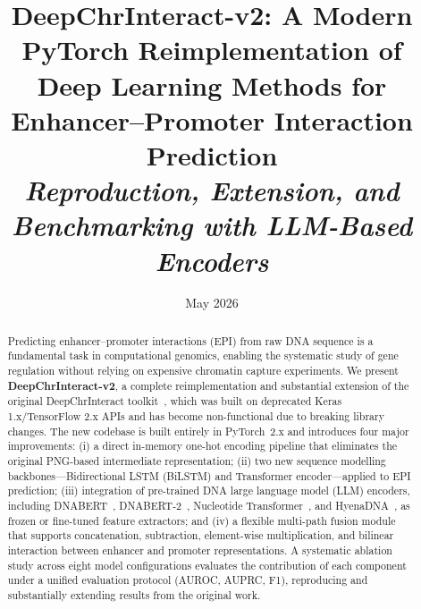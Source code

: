 \documentclass[12pt, a4paper]{article}
\title{
  \textbf{DeepChrInteract-v2: A Modern PyTorch Reimplementation of\\
  Deep Learning Methods for Enhancer--Promoter Interaction Prediction}\\[0.5em]
  \large\textit{Reproduction, Extension, and Benchmarking with LLM-Based Encoders}
}
\author{}
\date{May 2026}
\begin{document}
\maketitle
\thispagestyle{fancy}

\begin{abstract}
\noindent
Predicting enhancer--promoter interactions (EPI) from raw DNA sequence is a fundamental task
in computational genomics, enabling the systematic study of gene regulation without relying
on expensive chromatin capture experiments.
We present \textbf{DeepChrInteract-v2}, a complete reimplementation and substantial extension
of the original DeepChrInteract toolkit~\cite{deepchrinteract_doc}, which was built on deprecated
Keras 1.x/TensorFlow 2.x APIs and has become non-functional due to breaking library changes.
The new codebase is built entirely in PyTorch~2.x and introduces four major improvements:
(i) a direct in-memory one-hot encoding pipeline that eliminates the original
PNG-based intermediate representation;
(ii) two new sequence modelling backbones---Bidirectional LSTM (BiLSTM)
and Transformer encoder---applied to EPI prediction;
(iii) integration of pre-trained DNA large language model (LLM) encoders,
including DNABERT~\cite{dnabert}, DNABERT-2~\cite{dnabert2},
Nucleotide Transformer~\cite{nucleotide_transformer}, and HyenaDNA~\cite{hyenadna},
as frozen or fine-tuned feature extractors;
and (iv) a flexible multi-path fusion module that supports concatenation, subtraction,
element-wise multiplication, and bilinear interaction between enhancer and promoter
representations.
A systematic ablation study across eight model configurations evaluates
the contribution of each component under a unified evaluation protocol
(AUROC, AUPRC, F1), reproducing and substantially extending results from
the original work.
\end{abstract}

\newpage
\tableofcontents
\clearpage








\newpage


\end{document}
